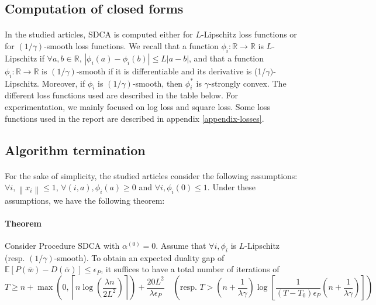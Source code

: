 \documentclass{article}
\newcommand{\abs}[1]{\left|#1\right|}
\newcommand{\norm}[1]{\left\|#1 \right\|}
\begin{document}
\subsection{Computation of closed forms}

\paragraph{}In the studied articles, SDCA is computed either for $L$-Lipschitz loss functions or for $(1/\gamma)$-smooth loss functions.
We recall that a function $\phi_i : \mathbb{R} \rightarrow \mathbb{R}$ is $L$-Lipschitz if $\forall a,b \in \mathbb{R}$, $\abs{\phi_i(a)-\phi_i(b)} \leq L \abs{a-b}$, and that a function $\phi_i : \mathbb{R} \rightarrow \mathbb{R}$ is $(1/\gamma)$-smooth if it is differentiable and its derivative is (1/$\gamma)$-Lipschitz.
Moreover, if $\phi_i$ is $(1/\gamma)$-smooth, then $\phi_i^{*}$ is $\gamma$-strongly convex.
The different loss functions used are described in the table below.
For experimentation, we mainly focused on log loss and square loss.
Some loss functions used in the report are described in appendix \ref{appendix-losses}.

\subsection{Algorithm termination}

\paragraph{}For the sake of simplicity, the studied articles consider the following assumptions: $\forall i, \norm{x_i} \leq 1$, $\forall (i,a), \phi_i(a) \geq 0$ and $\forall i, \phi_i(0) \leq 1$.
Under these assumptions, we have the following theorem:

\paragraph{Theorem} Consider Procedure SDCA with $\alpha^{(0)} = 0$.
Assume that $\forall i, \phi_i$ is $L$-Lipschitz (resp. $(1/\gamma)$-smooth).
To obtain an expected duality gap of $\mathbb{E}[P(\overline{w})-D(\overline{\alpha})] \leq \epsilon_P$, it suffices to have a total number of iterations of
$$T \geq n + \max\left(0, \left\lceil n \log \left(\dfrac{\lambda n}{2 L^2} \right) \right\rceil \right) + \dfrac{20 L^2}{\lambda \epsilon_P} \quad \left( \text{resp. } T > \left(n + \dfrac{1}{\lambda \gamma} \right) \log \left[ \dfrac{1}{(T-T_0)\epsilon_P} \left(n + \dfrac{1}{\lambda \gamma} \right) \right] \right)$$ 
\end{document}
